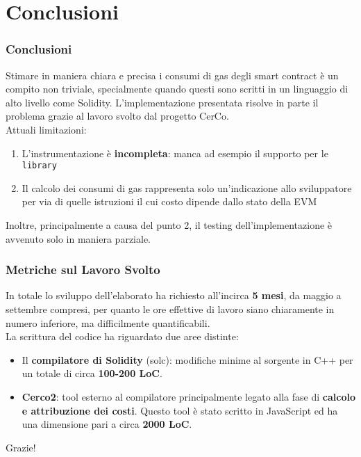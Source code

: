 \documentclass{beamer}
\begin{document}
\section{Conclusioni}
\begin{frame}
    \frametitle{Conclusioni}
    Stimare in maniera chiara e precisa i consumi di gas degli smart contract \`{e} un compito non triviale, specialmente quando questi sono scritti in un linguaggio di alto livello come Solidity. L'implementazione presentata risolve in parte il problema grazie al lavoro svolto dal progetto CerCo.\\
    \vspace{1em}
    Attuali limitazioni:
    \begin{enumerate}
        \item L'instrumentazione \`{e} \textbf{incompleta}: manca ad esempio il supporto per le \texttt{library}
        \item Il calcolo dei consumi di gas rappresenta solo un'indicazione allo sviluppatore per via di quelle istruzioni il cui costo dipende dallo stato della EVM
    \end{enumerate}
    \vspace{1em}
    Inoltre, principalmente a causa del punto 2, il testing dell'implementazione \`{e} avvenuto solo in maniera parziale.
\end{frame}

\begin{frame}
    \frametitle{Metriche sul Lavoro Svolto}
    In totale lo sviluppo dell'elaborato ha richiesto all'incirca \textbf{5 mesi}, da maggio a settembre compresi, per quanto le ore effettive di lavoro siano chiaramente in numero inferiore, ma difficilmente quantificabili.\\
    \vspace{1em}
    La scrittura del codice ha riguardato due aree distinte:
    \begin{itemize}
        \item Il \textbf{compilatore di Solidity} (solc): modifiche minime al sorgente in C++ per un totale di circa \textbf{100-200 LoC}.
        \item \textbf{Cerco2}: tool esterno al compilatore principalmente legato alla fase di \textbf{calcolo e attribuzione dei costi}. Questo tool \`{e} stato scritto in JavaScript ed ha una dimensione pari a circa \textbf{2000 LoC}.
    \end{itemize}
\end{frame}
\begin{frame}
    \centering
    \fontsize{24pt}{0pt}\selectfont
    Grazie!
\end{frame}
\end{document}
